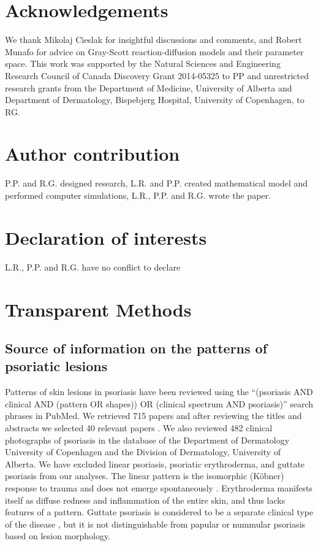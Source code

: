 \section{Acknowledgements}
We thank Mikolaj Cieslak for insightful discussions and comments, and Robert Munafo for advice on Gray-Scott reaction-diffusion models and their parameter space. This work was supported by the Natural Sciences and Engineering Research Council of Canada Discovery Grant 2014-05325 to PP and unrestricted research grants from the Department of Medicine, University of Alberta and Department of Dermatology, Bispebjerg Hospital, University of Copenhagen, to RG.

\section{Author contribution}
P.P. and R.G. designed research, L.R. and P.P. created mathematical model and performed computer simulations, L.R., P.P. and R.G. wrote the paper. 

\section{Declaration of interests}
L.R., P.P. and R.G. have no conflict to declare

\section{Transparent Methods}
\subsection{Source of information on the patterns of psoriatic lesions}
Patterns of skin lesions in psoriasis have been reviewed using the “(psoriasis AND clinical AND (pattern OR shapes)) OR (clinical spectrum AND psoriasis)” search phrases in PubMed. We retrieved 715 papers and after reviewing the titles and abstracts we selected 40 relevant papers \citep{ayala2007, baker1971, balato2009, beylot1979, buxton1987, champion1986, chau2017, christophers2001, cordoro2008, dimeglio2014, fernandes2011, gropper2001, hernandez2017, hodge1977, jablonska2000, kumar1995, lal1966, lebwohl2003, magro1997, meier2009, melski1983, menter1991, gopal2013, mitchell1962, morris2001, naldi2007, de2010, picciani2017, rasmussen1986, raychaudhuri2014, reich2009, saleh2018, schon2005, seneschal2012, stankier1974, stern1997, talwar1995, whyte1964, wollenberg2011, ziemer2009}. We also reviewed 482 clinical photographs of psoriasis in the database of the Department of Dermatology University of Copenhagen and the Division of Dermatology, University of Alberta. We have excluded linear psoriasis, psoriatic erythroderma, and guttate psoriasis from our analyses. The linear pattern is the isomorphic (Köbner) response to trauma and does not emerge spontaneously \citep{melski1983}. Erythroderma manifests itself as diffuse redness and inflammation of the entire skin, and thus lacks features of a pattern. Guttate psoriasis is considered to be a separate clinical type of the disease \citep{rasmussen1986, raychaudhuri2014, whyte1964}, but it is not distinguishable from papular or nummular psoriasis based on lesion morphology. 

